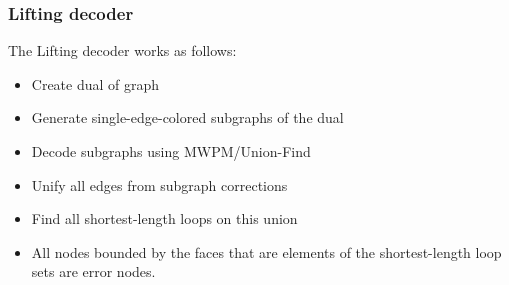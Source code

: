 \subsubsection{Lifting decoder}\label{sec: lifting}
The Lifting decoder works as follows:
\begin{itemize}
    \item Create dual of graph
    \item Generate single-edge-colored subgraphs of the dual
    \item Decode subgraphs using MWPM/Union-Find
    \item Unify all edges from subgraph corrections
    \item Find all shortest-length loops on this union
    \item All nodes bounded by the faces that are elements of the shortest-length loop sets
    are error nodes. 
    
\end{itemize}